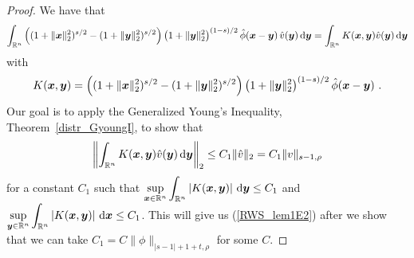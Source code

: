 \begin{proof}
We have that
\[
\int_{\mathbb{R}^n} \left( (1+\|{\bm{x}}\|_2^2)^{s/2} - (1+\|{\bm{y}}\|_2^2)^{s/2}\right)
\left( 1 + \|{\bm{y}}\|_2^2\right)^{(1-s)/2} \hat{\phi}({\bm{x}}-{\bm{y}}) \,
\hat{v}({\bm{y}}) \,\mathrm{d}{{\bm{y}}}
= \int_{\mathbb{R}^n} K({\bm{x}},{\bm{y}}) \hat{v}({\bm{y}}) \,\mathrm{d}{{\bm{y}}}
\]
with
\[
K({\bm{x}},{\bm{y}}) =
\left( (1+\|{\bm{x}}\|_2^2)^{s/2} - (1+\|{\bm{y}}\|_2^2)^{s/2}\right)
\left( 1 + \|{\bm{y}}\|_2^2\right)^{(1-s)/2}
\hat{\phi}({\bm{x}}-{\bm{y}}) \ .
\]
Our goal is to apply the Generalized Young's Inequality,
Theorem~\ref{distr_GyoungI}, to show that
\[
\left\| \int_{\mathbb{R}^n} K({\bm{x}},{\bm{y}}) \hat{v}({\bm{y}}) \,\mathrm{d}{{\bm{y}}}
\right\|_2 \leq C_1 \|\hat{v}\|_2 = C_1 \|v\|_{s-1,\rho}
\]
for a constant $C_1$ such that
$\displaystyle
\sup_{{\bm{x}}\in \mathbb{R}^n} \int_{\mathbb{R}^n} \left|K({\bm{x}},{\bm{y}})\right| \,\mathrm{d}{{\bm{y}}}
\leq C_1$
and
$\displaystyle
\sup_{{\bm{y}}\in \mathbb{R}^n} \int_{\mathbb{R}^n} \left|K({\bm{x}},{\bm{y}})\right|
\,\mathrm{d}{{\bm{x}}} \leq C_1$.
This will give us (\ref{RWS_lem1E2}) after we show that we can take
$C_1 = C \|\phi\|_{|s-1|+1+t,\rho}$ for some $C$.


\end{proof}
